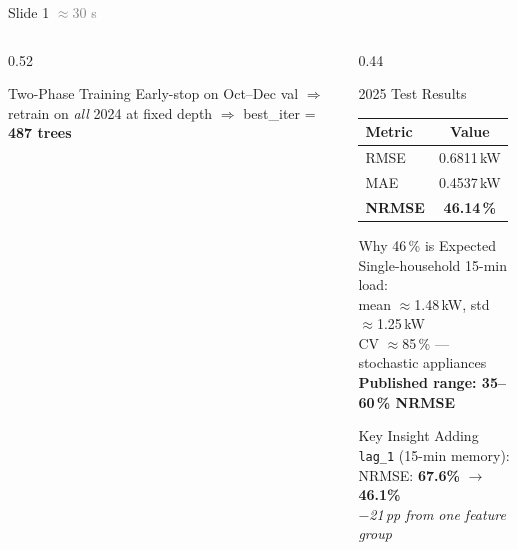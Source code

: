\documentclass[aspectratio=169, 10pt]{beamer}
\newcommand{\good}[1]{\textcolor{greenok}{\textbf{#1}}}
\newcommand{\bad}[1]{\textcolor{reddanger}{\textbf{#1}}}
\begin{document}
\begin{frame}{Slide 1 \hfill \textcolor{gray}{\small$\approx$30 s}}
\begin{columns}[T]
\begin{column}{0.52\textwidth}
      \vspace{4pt}
      \begin{alertblock}{Two-Phase Training}
        Early-stop on Oct--Dec val
        $\Rightarrow$ retrain on \textit{all} 2024 at fixed depth
        $\Rightarrow$ best\_iter = \textbf{487 trees}
      \end{alertblock}
    \end{column}

    \begin{column}{0.44\textwidth}
      \begin{block}{2025 Test Results}
        \centering
        \renewcommand{\arraystretch}{1.4}
        \begin{tabular}{lc}
          \toprule
          \textbf{Metric} & \textbf{Value} \\
          \midrule
          RMSE  & 0.6811\,kW \\
          MAE   & 0.4537\,kW \\
          \rowcolor{solaryellow!30}
          \textbf{NRMSE} & \textbf{46.14\,\%} \\
          \bottomrule
        \end{tabular}
      \end{block}

      \vspace{6pt}
      \begin{exampleblock}{Why 46\,\% is Expected}
        \small
        Single-household 15-min load:\\
        mean $\approx$1.48\,kW, std $\approx$1.25\,kW\\
        CV $\approx$85\,\% --- stochastic appliances\\
        \textbf{Published range: 35--60\,\% NRMSE}
      \end{exampleblock}

      \vspace{4pt}
      \begin{exampleblock}{Key Insight}
        \small Adding \texttt{lag\_1} (15-min memory):\\
        NRMSE: \bad{67.6\%} $\rightarrow$ \good{46.1\%}\\
        \textit{$-$21\,pp from one feature group}
      \end{exampleblock}
    \end{column}
  \end{columns}
\end{frame}
\end{document}
